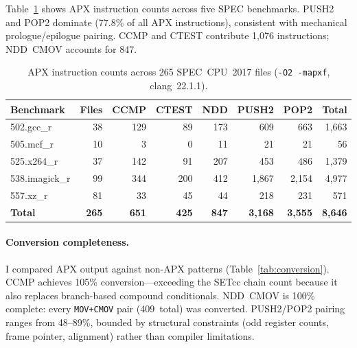 \documentclass[acmsmall,nonacm]{acmart}
\begin{document}
Table~\ref{tab:spec} shows APX instruction counts across five SPEC
benchmarks. PUSH2 and POP2 dominate (77.8\% of all APX instructions),
consistent with mechanical prologue/epilogue pairing. CCMP and CTEST
contribute 1,076 instructions; NDD~CMOV accounts for 847.

\begin{table}[t]
  \caption{APX instruction counts across 265 SPEC~CPU~2017 files
    (\texttt{-O2 -mapxf}, clang~22.1.1).}
  \label{tab:spec}
  \footnotesize
  \begin{tabular}{lrrrrrrr}
    \toprule
    Benchmark & Files & CCMP & CTEST & NDD & PUSH2 & POP2 & Total \\
    \midrule
    502.gcc\_r    & 38  & 129 & 89  & 173  & 609   & 663   & 1,663 \\
    505.mcf\_r    & 10  & 3   & 0   & 11   & 21    & 21    & 56    \\
    525.x264\_r   & 37  & 142 & 91  & 207  & 453   & 486   & 1,379 \\
    538.imagick\_r & 99  & 344 & 200 & 412  & 1,867 & 2,154 & 4,977 \\
    557.xz\_r     & 81  & 33  & 45  & 44   & 218   & 231   & 571   \\
    \midrule
    \textbf{Total} & \textbf{265} & \textbf{651} & \textbf{425}
      & \textbf{847} & \textbf{3,168} & \textbf{3,555} & \textbf{8,646} \\
    \bottomrule
  \end{tabular}
\end{table}

\paragraph{Conversion completeness.}
I compared APX output against non-APX patterns
(Table~\ref{tab:conversion}). CCMP achieves 105\% conversion---exceeding
the SETcc chain count because it also replaces branch-based compound
conditionals. NDD~CMOV is 100\% complete: every \texttt{MOV+CMOV}
pair (409~total) was converted. PUSH2/POP2 pairing ranges from 48--89\%,
bounded by structural constraints (odd register counts, frame pointer,
alignment) rather than compiler limitations.
\end{document}
